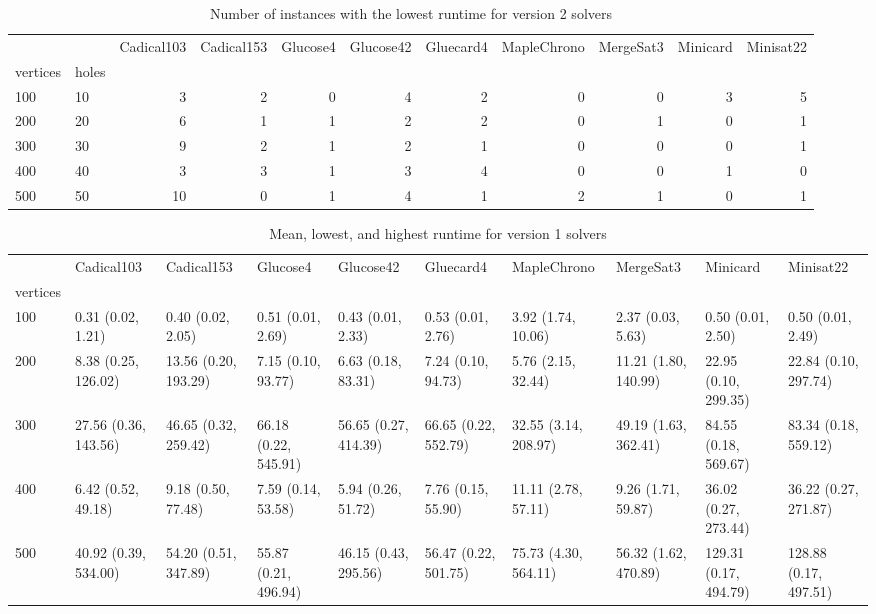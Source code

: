 \begin{table}[htbp]
\tiny
\centering
\begin{tabular}{llrrrrrrrrr}
\toprule
 & & Cadical103 & Cadical153 & Glucose4 & Glucose42 & Gluecard4 & MapleChrono & MergeSat3 & Minicard & Minisat22 \\
vertices & holes &  &  &  &  &  &  &  &  &  \\
\midrule
100 & 10 & 3 & 2 & 0 & 4 & 2 & 0 & 0 & 3 & 5 \\
\cline{1-11}
200 & 20 & 6 & 1 & 1 & 2 & 2 & 0 & 1 & 0 & 1 \\
\cline{1-11}
300 & 30 & 9 & 2 & 1 & 2 & 1 & 0 & 0 & 0 & 1 \\
\cline{1-11}
400 & 40 & 3 & 3 & 1 & 3 & 4 & 0 & 0 & 1 & 0 \\
\cline{1-11}
500 & 50 & 10 & 0 & 1 & 4 & 1 & 2 & 1 & 0 & 1 \\
\cline{1-11}
\bottomrule
\end{tabular}
\caption{Number of instances with the lowest runtime for version 2 solvers}
\label{tab:SAT_small_time_v2}
\end{table}

\begin{table}[htbp]
    \tiny
    \centering
    \begin{tabular}{llllllllll}
\toprule
 & Cadical103 & Cadical153 & Glucose4 & Glucose42 & Gluecard4 & MapleChrono & MergeSat3 & Minicard & Minisat22 \\
vertices &  &  &  &  &  &  &  &  &  \\
\midrule
100 & 0.31 (0.02, 1.21) & 0.40 (0.02, 2.05) & 0.51 (0.01, 2.69) & 0.43 (0.01, 2.33) & 0.53 (0.01, 2.76) & 3.92 (1.74, 10.06) & 2.37 (0.03, 5.63) & 0.50 (0.01, 2.50) & 0.50 (0.01, 2.49) \\
200 & 8.38 (0.25, 126.02) & 13.56 (0.20, 193.29) & 7.15 (0.10, 93.77) & 6.63 (0.18, 83.31) & 7.24 (0.10, 94.73) & 5.76 (2.15, 32.44) & 11.21 (1.80, 140.99) & 22.95 (0.10, 299.35) & 22.84 (0.10, 297.74) \\
300 & 27.56 (0.36, 143.56) & 46.65 (0.32, 259.42) & 66.18 (0.22, 545.91) & 56.65 (0.27, 414.39) & 66.65 (0.22, 552.79) & 32.55 (3.14, 208.97) & 49.19 (1.63, 362.41) & 84.55 (0.18, 569.67) & 83.34 (0.18, 559.12) \\
400 & 6.42 (0.52, 49.18) & 9.18 (0.50, 77.48) & 7.59 (0.14, 53.58) & 5.94 (0.26, 51.72) & 7.76 (0.15, 55.90) & 11.11 (2.78, 57.11) & 9.26 (1.71, 59.87) & 36.02 (0.27, 273.44) & 36.22 (0.27, 271.87) \\
500 & 40.92 (0.39, 534.00) & 54.20 (0.51, 347.89) & 55.87 (0.21, 496.94) & 46.15 (0.43, 295.56) & 56.47 (0.22, 501.75) & 75.73 (4.30, 564.11) & 56.32 (1.62, 470.89) & 129.31 (0.17, 494.79) & 128.88 (0.17, 497.51) \\
\bottomrule
\end{tabular}
\caption{Mean, lowest, and highest runtime for version 1 solvers}
\label{tab:my_label}
\end{table}

